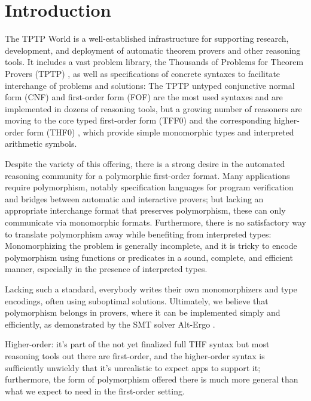 \section{Introduction}
\label{sec_intro}

The TPTP World \cite{sutcliffe-2010-world} is a well-established infrastructure
for supporting research, development, and deployment of automatic theorem
provers and other reasoning tools. It includes a vast problem library, the
Thousands of Problems for Theorem Provers (TPTP) \cite{sutcliffe-2009-lib}, as
well as specifications of concrete syntaxes to facilitate interchange of
problems and solutions: The TPTP untyped conjunctive normal form (CNF) and
first-order form (FOF) are the most used syntaxes and are implemented in dozens
of reasoning tools, but a growing number of reasoners are moving to the core
typed first-order form (TFF0) \cite{TFF0} and the corresponding higher-order
form (THF0) \cite{benzmueller-et-al-2008-thf0}, which provide simple monomorphic
types and interpreted arithmetic symbols.

Despite the variety of this offering, there is a strong desire in the automated
reasoning community for a polymorphic first-order format. Many applications
require polymorphism, notably specification languages for program verification
and bridges between automatic and interactive provers; but lacking an
appropriate interchange format that preserves polymorphism, these can only
communicate via monomorphic formats. Furthermore, there is no satisfactory way
to translate polymorphism away while benefiting from interpreted types:
Monomorphizing the problem is generally incomplete, and it is tricky to encode
polymorphism using functions or predicates in a sound, complete, and efficient
manner, especially in the presence of interpreted types.

Lacking such a standard, everybody writes their own monomorphizers and type
encodings, often using suboptimal solutions. Ultimately, we believe that
polymorphism belongs in provers, where it can be implemented simply and
efficiently, as demonstrated by the SMT solver Alt-Ergo \cite{bobot-et-al-2008}.

Higher-order: it's part of the not yet finalized full THF syntax \cite{xxx} but
most reasoning tools out there are first-order, and the higher-order syntax is
sufficiently unwieldy that it's unrealistic to expect apps to support it;
furthermore, the form of polymorphism offered there is much more general than
what we expect to need in the first-order setting.

